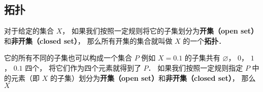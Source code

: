 

\subsection{拓扑}

对于给定的集合 $X$， 如果我们按照一定规则将它的子集划分为\textbf{开集（open set）}和\textbf{非开集（closed set）}， 那么所有开集的集合就叫做 $X$ 的一个\textbf{拓扑}．

它的所有不同的子集也可以构成一个集合 $P$ 例如 $X = \qty{0, 1}$ 的子集共有 $\varnothing$， $\qty{0}$， $\qty{1}$， $\qty{0, 1}$ 四个， 将它们作为四个元素就得到了 $P$． 如果我们按照一定规则指定 $P$ 中的元素（即 $X$ 的子集）划分为\textbf{开集（open set）}和\textbf{非开集（closed set）}， 那么 $X$